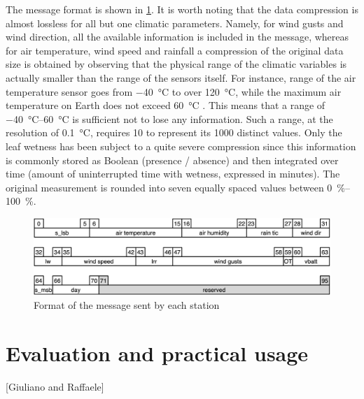 \documentclass[authoryear,preprint,review,12pt]{elsarticle}
\begin{document}
The message format is shown in \cref{fig:message-format}. 
It is worth noting that the data compression is almost lossless for all but one climatic parameters. 
Namely, for wind gusts and wind direction, all the available information  is included in the message, whereas for air temperature, wind speed and rainfall a compression of the original data size is obtained by observing that the physical range of the climatic variables is actually smaller than the range of the sensors itself. 
For instance, range of the air temperature sensor goes from \SI{-40}{\celsius} to over \SI{120}{\celsius}, while the maximum air temperature on Earth does not exceed \SI{60}{\celsius} \cite{court:max-temp,roof:max-temp}. 
This means that a range of \SIrange{-40}{60}{\celsius} is sufficient not to lose any information. 
Such a range, at the resolution of \SI{0.1}{\celsius}, requires \SI{10}{\bit} to represent its 1000 distinct values. 
Only the leaf wetness has been subject to a quite severe compression since this information is commonly stored as Boolean (presence / absence) and then integrated over time (amount of uninterrupted time with wetness, expressed in minutes). 
The original measurement is rounded into seven equally spaced values between \SIrange{0}{100}{\%}.

\begin{figure}
    \centering
    \includegraphics[scale=.55]{message_format.png}
    \caption{Format of the message sent by each station}
    \label{fig:message-format}
\end{figure}


\section{Evaluation and practical usage}[Giuliano and Raffaele]
\end{document}
